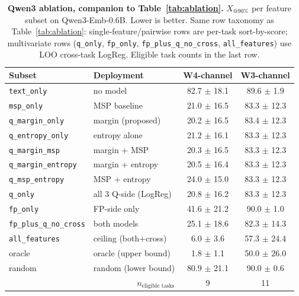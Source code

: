 \documentclass{article}
\makeatletter
\newcommand{\xat}[1]{\ensuremath{X_{@#1\%}}}
\makeatother
\begin{document}
\begin{table}[t]
\centering
\caption{\textbf{Qwen3 ablation, companion to Table~\ref{tab:ablation}.} \xat{90} per feature subset on Qwen3-Emb-0.6B. Lower is better. Same row taxonomy as Table~\ref{tab:ablation}: single-feature/pairwise rows are per-task sort-by-score; multivariate rows (\texttt{q\_only}, \texttt{fp\_only}, \texttt{fp\_plus\_q\_no\_cross}, \texttt{all\_features}) use LOO cross-task LogReg. Eligible task counts in the last row.}
\label{tab:qwen3}
\small
\setlength{\tabcolsep}{5pt}
\begin{tabular}{llcc}
\toprule
Subset & Deployment & W4-channel & W3-channel \\
\midrule
\texttt{text\_only}             & no model               & 82.7 $\pm$ 18.1 & 89.6 $\pm$ 1.9 \\
\texttt{msp\_only}              & MSP baseline           & 21.0 $\pm$ 16.5 & 83.3 $\pm$ 12.3 \\
\texttt{q\_margin\_only}        & margin (proposed)      & 20.2 $\pm$ 16.5 & 83.4 $\pm$ 12.3 \\
\texttt{q\_entropy\_only}       & entropy alone          & 21.2 $\pm$ 16.1 & 83.3 $\pm$ 12.3 \\
\texttt{q\_margin\_msp}         & margin + MSP           & 20.3 $\pm$ 16.5 & 83.3 $\pm$ 12.3 \\
\texttt{q\_margin\_entropy}     & margin + entropy       & 20.5 $\pm$ 16.4 & 83.3 $\pm$ 12.3 \\
\texttt{q\_msp\_entropy}        & MSP + entropy          & 24.0 $\pm$ 15.0 & 83.3 $\pm$ 12.3 \\
\texttt{q\_only}                & all 3 Q-side (LogReg)  & 20.8 $\pm$ 16.2 & 83.3 $\pm$ 12.3 \\
\texttt{fp\_only}               & FP-side only           & 41.6 $\pm$ 21.2 & 90.0 $\pm$ 1.0 \\
\texttt{fp\_plus\_q\_no\_cross} & both models            & 25.1 $\pm$ 18.6 & 82.3 $\pm$ 14.3 \\
\texttt{all\_features}          & ceiling (both+cross)   & 6.0 $\pm$ 3.6   & 57.3 $\pm$ 24.4 \\
\midrule
oracle                          & oracle (upper bound)   & 1.8 $\pm$ 1.1   & 50.0 $\pm$ 26.0 \\
random                          & random (lower bound)   & 80.9 $\pm$ 21.1 & 90.0 $\pm$ 0.6 \\
\midrule
\multicolumn{2}{r}{$n_{\text{eligible tasks}}$} & 9 & 11 \\
\bottomrule
\end{tabular}
\end{table}
\end{document}
